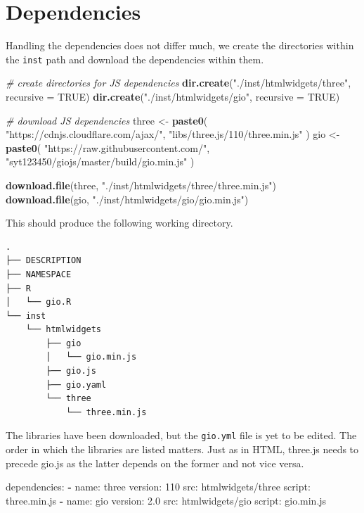 \documentclass[10pt,]{krantz}
\makeatletter
\newenvironment{Shaded}{\begin{snugshade}}{\end{snugshade}}
\newcommand{\AttributeTok}[1]{\textcolor[rgb]{0.61,0.61,0.61}{#1}}
\newcommand{\CommentTok}[1]{\textcolor[rgb]{0.37,0.37,0.37}{\textit{#1}}}
\newcommand{\DataTypeTok}[1]{\textcolor[rgb]{0.27,0.27,0.27}{#1}}
\newcommand{\DecValTok}[1]{\textcolor[rgb]{0.06,0.06,0.06}{#1}}
\newcommand{\FloatTok}[1]{\textcolor[rgb]{0.06,0.06,0.06}{#1}}
\newcommand{\FunctionTok}[1]{\textcolor[rgb]{0,0,0}{#1}}
\newcommand{\KeywordTok}[1]{\textcolor[rgb]{0.27,0.27,0.27}{\textbf{#1}}}
\newcommand{\NormalTok}[1]{#1}
\newcommand{\OtherTok}[1]{\textcolor[rgb]{0.37,0.37,0.37}{#1}}
\newcommand{\StringTok}[1]{\textcolor[rgb]{0.5,0.5,0.5}{#1}}
\newenvironment{kframe}{%
\medskip{}
\setlength{\fboxsep}{.8em}
 \def\at@end@of@kframe{}%
 \ifinner\ifhmode%
  \def\at@end@of@kframe{\end{minipage}}%
  \begin{minipage}{\columnwidth}%
 \fi\fi%
 \def\FrameCommand##1{\hskip\@totalleftmargin \hskip-\fboxsep
 \colorbox{shadecolor}{##1}\hskip-\fboxsep
     \hskip-\linewidth \hskip-\@totalleftmargin \hskip\columnwidth}%
 \MakeFramed {\advance\hsize-\width
   \@totalleftmargin\z@ \linewidth\hsize
   \@setminipage}}%
 {\par\unskip\endMakeFramed%
 \at@end@of@kframe}
\renewenvironment{Shaded}{\begin{kframe}}{\end{kframe}}
\makeatother
\begin{document}
\hypertarget{widgets-full-deps}{%
\section{Dependencies}\label{widgets-full-deps}}

Handling the dependencies does not differ much, we create the directories within the \texttt{inst} path and download the dependencies within them.

\begin{Shaded}
\begin{Highlighting}[]
\CommentTok{# create directories for JS dependencies}
\KeywordTok{dir.create}\NormalTok{(}\StringTok{"./inst/htmlwidgets/three"}\NormalTok{, }\DataTypeTok{recursive =} \OtherTok{TRUE}\NormalTok{)}
\KeywordTok{dir.create}\NormalTok{(}\StringTok{"./inst/htmlwidgets/gio"}\NormalTok{, }\DataTypeTok{recursive =} \OtherTok{TRUE}\NormalTok{)}

\CommentTok{# download JS dependencies}
\NormalTok{three <-}\StringTok{ }\KeywordTok{paste0}\NormalTok{(}
  \StringTok{"https://cdnjs.cloudflare.com/ajax/"}\NormalTok{,}
  \StringTok{"libs/three.js/110/three.min.js"}
\NormalTok{)}
\NormalTok{gio <-}\StringTok{ }\KeywordTok{paste0}\NormalTok{(}
  \StringTok{"https://raw.githubusercontent.com/"}\NormalTok{,}
  \StringTok{"syt123450/giojs/master/build/gio.min.js"}
\NormalTok{)}

\KeywordTok{download.file}\NormalTok{(three, }\StringTok{"./inst/htmlwidgets/three/three.min.js"}\NormalTok{)}
\KeywordTok{download.file}\NormalTok{(gio, }\StringTok{"./inst/htmlwidgets/gio/gio.min.js"}\NormalTok{)}
\end{Highlighting}
\end{Shaded}

This should produce the following working directory.

\begin{verbatim}
.
├── DESCRIPTION
├── NAMESPACE
├── R
│   └── gio.R
└── inst
    └── htmlwidgets
        ├── gio
        │   └── gio.min.js
        ├── gio.js
        ├── gio.yaml
        └── three
            └── three.min.js
\end{verbatim}

The libraries have been downloaded, but the \texttt{gio.yml} file is yet to be edited. The order in which the libraries are listed matters. Just as in HTML, three.js needs to precede gio.js as the latter depends on the former and not vice versa.

\begin{Shaded}
\begin{Highlighting}[]
\FunctionTok{dependencies:}
  \KeywordTok{-} \FunctionTok{name:}\AttributeTok{ three}
    \FunctionTok{version:}\AttributeTok{ }\DecValTok{110}
    \FunctionTok{src:}\AttributeTok{ htmlwidgets/three}
    \FunctionTok{script:}\AttributeTok{ three.min.js}
  \KeywordTok{-} \FunctionTok{name:}\AttributeTok{ gio}
    \FunctionTok{version:}\AttributeTok{ }\FloatTok{2.0}
    \FunctionTok{src:}\AttributeTok{ htmlwidgets/gio}
    \FunctionTok{script:}\AttributeTok{ gio.min.js}
\end{Highlighting}
\end{Shaded}
\end{document}
